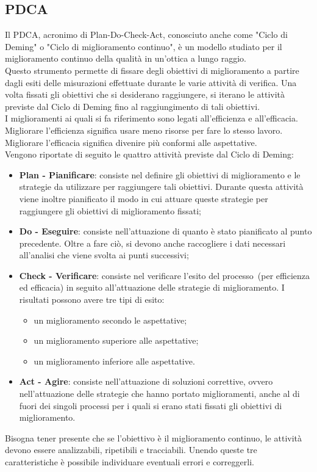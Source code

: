 \documentclass[../PianoDiQualifica.tex]{subfiles}
\begin{document}
\begin{appendices}

\section{PDCA}
	Il PDCA\g, acronimo di Plan-Do-Check-Act, conosciuto anche come "Ciclo di Deming" o "Ciclo di miglioramento continuo", è un modello studiato per il miglioramento continuo della qualità in un'ottica a lungo raggio.\\
	Questo strumento permette di fissare degli obiettivi di miglioramento a partire dagli esiti delle misurazioni effettuate durante le varie attività di verifica. Una volta fissati gli obiettivi che si desiderano raggiungere, si iterano le attività previste dal Ciclo di Deming fino al raggiungimento di tali obiettivi.\\
	I miglioramenti ai quali si fa riferimento sono legati all'efficienza e all'efficacia. Migliorare l'efficienza significa usare meno risorse per fare lo stesso lavoro. Migliorare l'efficacia significa divenire più conformi alle aspettative.\\
	Vengono riportate di seguito le quattro attività previste dal Ciclo di Deming:
	\begin{itemize}
		\item \textbf{Plan - Pianificare}: consiste nel definire gli obiettivi di miglioramento e le strategie da utilizzare per raggiungere tali obiettivi. Durante questa attività viene inoltre pianificato il modo in cui attuare queste strategie per raggiungere gli obiettivi di miglioramento fissati;
		\item \textbf{Do - Eseguire}: consiste nell'attuazione di quanto è stato pianificato al punto precedente. Oltre a fare ciò, si devono anche raccogliere i dati necessari all’analisi che viene svolta ai punti successivi;
		\item \textbf{Check - Verificare}: consiste nel verificare l'esito del processo\g\ (per efficienza ed efficacia) in seguito all'attuazione delle strategie di miglioramento. I risultati possono avere tre tipi di esito:
		\begin{itemize}
			\item un miglioramento secondo le aspettative;
			\item un miglioramento superiore alle aspettative;
			\item un miglioramento inferiore alle aspettative.
		\end{itemize}
		\item \textbf{Act - Agire}: consiste nell'attuazione di soluzioni correttive, ovvero nell'attuazione delle strategie che hanno portato miglioramenti, anche al di fuori dei singoli processi per i quali si erano stati fissati gli obiettivi di miglioramento.
	\end{itemize}
	Bisogna tener presente che se l'obiettivo è il miglioramento continuo, le attività devono essere analizzabili, ripetibili e tracciabili. 
	Unendo queste tre caratteristiche è possibile individuare eventuali errori e correggerli.
\end{appendices}
\end{document}
